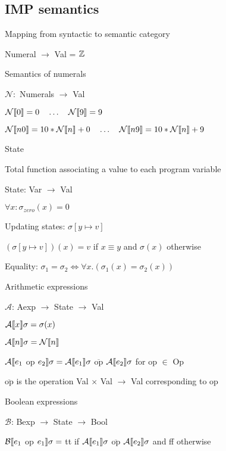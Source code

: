 \subsection{IMP semantics}
\enumstart
	\item Mapping from syntactic to semantic category
	\enumstart
		\item Numeral $\rightarrow$ Val = $\mathbb{Z}$
	\enumend
	\item Semantics of numerals
	\enumstart
		\item $\mathcal{N}:$ Numerals $\rightarrow$ Val
		\item $\mathcal{N}\llb 0 \rrb = 0 \ \ \ \mathellipsis \ \ \ \mathcal{N}\llb 9 \rrb = 9$
		\item $\mathcal{N}\llbracket n 0\rrbracket = 10*\mathcal{N}\llbracket n \rrbracket + 0 \ \ \ \mathellipsis \ \ \ \mathcal{N}\llbracket n 9 \rrbracket = 10*\mathcal{N}\llbracket n \rrbracket + 9$
	\enumend
	\item State
	\enumstart
		\item Total function associating a value to each program variable
		\item State: Var $\rightarrow$ Val
		\item $\forall x: \sigma_{zero}(x) = 0$
		\item Updating states: $\sigma[y \mapsto v]$
		\item $(\sigma[y \mapsto v])(x) = v$ if $x \equiv y$ and $\sigma(x)$ otherwise
		\item Equality: $\sigma_1 = \sigma_2 \Leftrightarrow \forall x.(\sigma_1(x) = \sigma_2(x))$
	\enumend
	\item Arithmetic expressions
	\enumstart
		\item $\mathcal{A}$: Aexp $\rightarrow$ State $\rightarrow$ Val
		\item $\mathcal{A}\llbracket x \rrbracket \sigma = \sigma(x)$
		\item $\mathcal{A}\llbracket n \rrbracket \sigma = \mathcal{N}\llbracket n \rrbracket$
		\item $\mathcal{A}\llbracket e_1$ op $e_2\rrbracket \sigma = \mathcal{A}\llbracket e_1 \rrbracket \sigma$ $\overline{\text{op}}$ $\mathcal{A}\llbracket e_2\rrbracket \sigma$ for op $\in$ Op
		\item $\overline{\text{op}}$ is the operation Val $\times$ Val $\rightarrow$ Val corresponding to op
	\enumend
	\item Boolean expressions
	\enumstart
		\item $\mathcal{B}$: Bexp $\rightarrow$ State $\rightarrow$ Bool
		\item $\mathcal{B}\llbracket e_1$ op $e_1\rrbracket \sigma =$ tt if $\mathcal{A}\llbracket e_1 \rrbracket \sigma$ $\overline{\text{op}}$ $\mathcal{A}\llbracket e_2\rrbracket \sigma$ and ff otherwise
